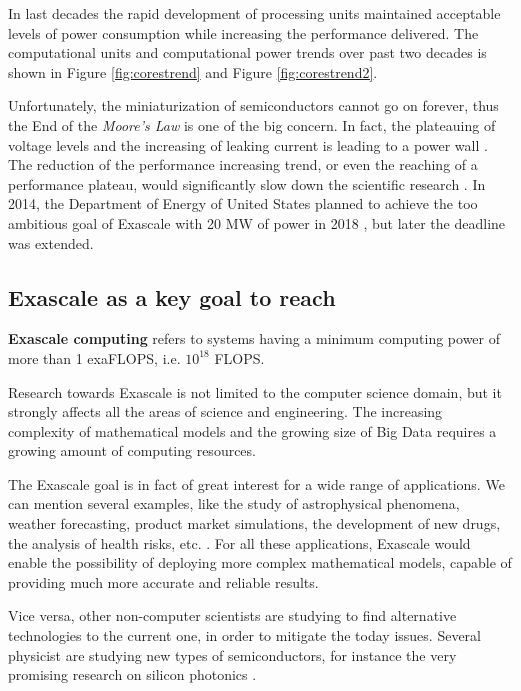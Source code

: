 In last decades the rapid development of processing units maintained
acceptable levels of power consumption while increasing the performance
delivered. The computational units and computational power trends over
past two decades is shown in Figure \ref{fig:corestrend} and Figure
\ref{fig:corestrend2}.

Unfortunately, the miniaturization of semiconductors cannot go on forever,
thus the End of the \emph{Moore's Law} is one of the big concern. In fact,
the plateauing of voltage levels and the increasing of leaking current is
leading to a power wall \cite{Villa2014}.
The reduction of the performance increasing
trend, or even the reaching of a performance plateau, would significantly slow
down the scientific research \cite{snir2011exascale}. In 2014, the Department
of Energy of United States planned to achieve the too ambitious goal of
Exascale with 20 MW of power in 2018 \cite{USExascale}, but later the deadline
was extended.

\subsection{Exascale as a key goal to reach}
\textbf{Exascale computing} refers to systems having a minimum computing power
of more than 1 exaFLOPS, i.e. \( 10^{18} \) FLOPS.

Research towards Exascale is not limited to the computer science domain, but it
strongly affects all the areas of science and engineering. The increasing
complexity of mathematical models and the growing size of Big Data requires
a growing amount of computing resources.

The Exascale goal is in fact of great interest for a wide range of
applications. We can mention several examples, like the study of astrophysical phenomena, weather forecasting, product market simulations, the development of
new drugs, the analysis of health risks, etc.
\cite{Reed:2015:ECB:2797100.2699414}. For all these applications, Exascale
would enable the possibility of deploying more complex mathematical models,
capable of providing much more accurate and reliable results.


Vice versa, other non-computer scientists
are studying to find alternative technologies to the current one, in order to
mitigate the today issues. Several physicist are studying new types of
semiconductors, for instance the very promising research on silicon photonics
\cite{6476868}.

